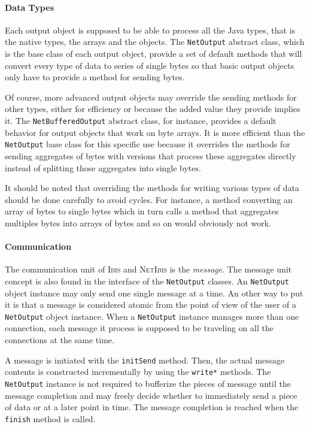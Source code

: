 \documentclass[11pt]{book}
\def\Ibis{\textsc{Ibis}\xspace}
\def\NetIbis{\textsc{NetIbis}\xspace}
\begin{document}
\paragraph{Data Types}
\label{sec:data-types}

Each output object is supposed to be able to process all the Java
types, that is the native types, the arrays and the objects. The
\texttt{NetOutput} abstract class, which is the base class of each
output object, provide a set of default methods that will convert
every type of data to series of single bytes so that basic output
objects only have to provide a method for sending bytes.

Of course, more advanced output objects may override the sending
methods for other types, either for efficiency or because the added
value they provide implies it. The \texttt{NetBufferedOutput} abstract
class, for instance, provides a default behavior for output objects
that work on byte arrays. It is more efficient than the
\texttt{NetOutput} base class for this specific use because it
overrides the methods for sending aggregates of bytes with versions
that process these aggregates directly instead of splitting those
aggregates into single bytes.

It should be noted that overriding the methods for writing various
types of data should be done carefully to avoid cycles. For instance,
a method converting an array of bytes to single bytes which in turn
calls a method that aggregates multiples bytes into arrays of bytes
and so on would obviously not work.


\paragraph{Communication}
\label{sec:communication}

The communication unit of \Ibis and \NetIbis is the \emph{message}.
The message unit concept is also found in the interface of the
\texttt{NetOutput} classes. An \texttt{NetOutput} object instance may
only send one single message at a time. An other way to put it is that
a message is considered atomic from the point of view of the user of a
\texttt{NetOutput} object instance. When a \texttt{NetOutput} instance
manages more than one connection, each message it process is supposed
to be traveling on all the connections at the same time.

A message is initiated with the \texttt{initSend} method. Then, the
actual message contents is constructed incrementally by using the
\texttt{write*} methods. The \texttt{NetOutput} instance is not
required to bufferize the pieces of message until the message
completion and may freely decide whether to immediately send a piece
of data or at a later point in time. The message completion is reached
when the \texttt{finish} method is called.
\end{document}
